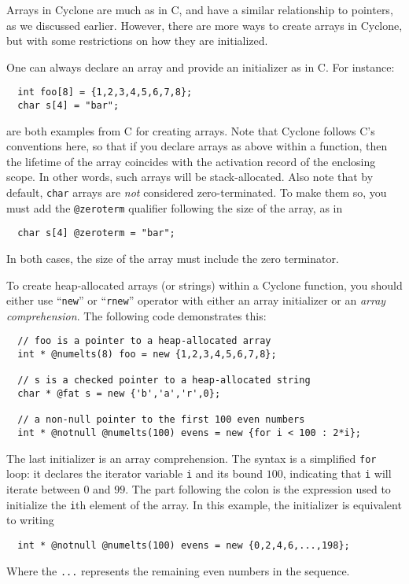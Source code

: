 Arrays in Cyclone are much as in C, and have a similar relationship to
pointers, as we discussed earlier.  However, there are more ways to
create arrays in Cyclone, but with some restrictions on how they are
initialized.

One can always declare an array and provide an initializer as in
C\@. For instance:
\begin{verbatim}
  int foo[8] = {1,2,3,4,5,6,7,8};
  char s[4] = "bar";
\end{verbatim}
are both examples from C for creating arrays.  Note that Cyclone
follows C's conventions here, so that if you declare arrays as above
within a function, then the lifetime of the array coincides with the
activation record of the enclosing scope.  In other words, such arrays
will be stack-allocated.  Also note that by default, \texttt{char}
arrays are \emph{not} considered zero-terminated.  To make them so,
you must add the \texttt{@zeroterm} qualifier following the size of
the array, as in
\begin{verbatim}
  char s[4] @zeroterm = "bar";
\end{verbatim}
In both cases, the size of the array must include the zero terminator.

To create heap-allocated arrays (or strings) within a Cyclone
function, you should either use ``\texttt{new}'' or ``\texttt{rnew}''
operator with either an array initializer or an \emph{array
comprehension}.  The following code demonstrates this:
\begin{verbatim}
  // foo is a pointer to a heap-allocated array
  int * @numelts(8) foo = new {1,2,3,4,5,6,7,8};

  // s is a checked pointer to a heap-allocated string
  char * @fat s = new {'b','a','r',0};

  // a non-null pointer to the first 100 even numbers
  int * @notnull @numelts(100) evens = new {for i < 100 : 2*i};
\end{verbatim}
The last initializer is an array comprehension.  The syntax is a
simplified \texttt{for} loop: it declares the iterator variable
\texttt{i} and its bound $100$, indicating that \texttt{i} will
iterate between $0$ and $99$.  The part following the colon is the
expression used to initialize the \texttt{i}th element of the array.
In this example, the initializer is equivalent to writing
\begin{verbatim}
  int * @notnull @numelts(100) evens = new {0,2,4,6,...,198};
\end{verbatim}
Where the \texttt{...} represents the remaining even numbers in the
sequence.

